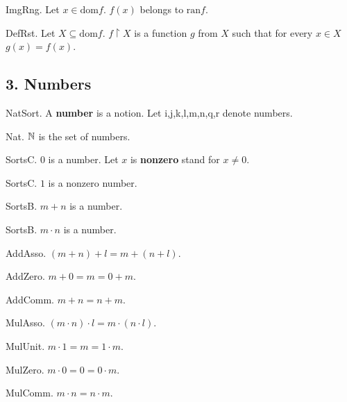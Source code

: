 \begin{lemma} ImgRng.
Let $x \in \text{dom} f$. $f(x)$ belongs to $\text{ran} f$.
\end{lemma}

\begin{definition} DefRst.
Let $X \subseteq \text{dom} f$. 
$f \upharpoonright X$ is a function $g$ from $X$
such that for every $x \in X$ $g(x) = f(x)$.
\end{definition}

\subsection{3. Numbers}


\begin{signature} NatSort.
A {\bf number} is a notion.
Let i,j,k,l,m,n,q,r denote numbers.
\end{signature}

\begin{definition} Nat.
${\Bbb N}$ is the set of numbers.
\end{definition}

\begin{signature} SortsC.  
$0$ is a number.
Let $x$ is {\bf nonzero} stand for $x \neq 0$.
\end{signature}

\begin{signature} SortsC.
$1$ is a nonzero number.
\end{signature}

\begin{signature} SortsB.
$m + n$ is a number.
\end{signature}

\begin{signature} SortsB.
$m \cdot n$ is a number.
\end{signature}

\begin{axiom} AddAsso. $(m + n) + l = m + (n + l)$.\end{axiom}
\begin{axiom} AddZero.  $m + 0 = m = 0 + m$. \end{axiom}
\begin{axiom} AddComm.   $m + n = n + m$. \end{axiom}

\begin{axiom} MulAsso.  
$(m \cdot n) \cdot l = m \cdot (n \cdot l)$.
\end{axiom}
\begin{axiom} MulUnit.  $m \cdot 1 = m = 1 \cdot m$.\end{axiom}
\begin{axiom} MulZero.  $m \cdot 0 = 0 = 0 \cdot m$.\end{axiom}
\begin{axiom} MulComm.  $m \cdot n = n \cdot m$.\end{axiom}

